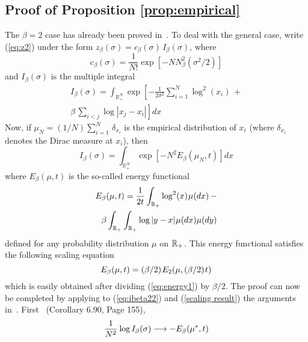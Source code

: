 \documentclass[draftclsnofoot]{IEEEtran}
\begin{document}
\subsection{Proof of Proposition \ref{prop:empirical}}
The $\beta = 2$ case has already been proved in~\cite{habilitation}. To deal with the general case, write (\ref{eq:z2}) under the form $z_{\beta}(\sigma)=c_{\beta}(\sigma)\,I_{\beta}(\sigma)$, where
$$
c_{\beta}(\sigma)=\frac{1}{N!}\exp\left[-NN^2_\beta(\sigma^2/2)\right]
$$
and $I_\beta(\sigma)$ is the multiple integral
\begin{align}
\nonumber I_\beta(\sigma) = \int_{\mathbb{R}^N_+}\exp\left[-\frac{1}{2\sigma^2}\sum^N_{i=1} \log^2(x_i)\right. \,+ \\
\nonumber \left. \beta\,\sum_{i<j} \log|x_j - x_i|\right]dx 
\end{align}
Now, if $\mu_{\scriptscriptstyle N} = (1/N)\sum^N_{i=1}\,\delta_{x_i}$ is the empirical distribution of $x_i$ (where $\delta_{x_i}$ denotes the Dirac measure at $x_i$), then 
\begin{equation} \label{eq:ibeta22}
I_\beta(\sigma) = \int_{\mathbb{R}^N_+}\exp\left[-N^2E_{\beta}(\mu_{\scriptscriptstyle N},t)\right]dx 
\end{equation}
where $E_{\beta}(\mu,t)$ is the so-called energy functional
\begin{align} \label{eq:energy1}
\nonumber E_{\beta}(\mu,t) = \frac{1}{2t}\int_{\mathbb{R}_+}\log^2(x)\hspace{0.02cm}\mu(dx) \,- \\\beta \int_{\mathbb{R}_+}\int_{\mathbb{R}_+} \log|y-x|\hspace{0.02cm}\mu(dx)\mu(dy)
\end{align}
defined for any probability distribution $\mu$ on $\mathbb{R}_+\hspace{0.02cm}$.
This energy functional satisfies the following scaling equation
\begin{equation} \label{scaling result}
    E_{\beta}(\mu,t)=(\beta/2)\hspace{0.03cm}E_{2}\!\left(\mu,(\beta/2)\hspace{0.03cm} t\right)
\end{equation}
which is easily obtained after dividing (\ref{eq:energy1}) by $\beta/2$. The proof can now be completed by applying to (\ref{eq:ibeta22}) and (\ref{scaling result}) the arguments in~\cite{deift}. First~\cite{deift} (Corollary 6.90, Page 155), 
$$
\frac{1}{N^2}\hspace{0.02cm}\log I_\beta(\sigma) \longrightarrow - E_{\beta}(\mu^*,t)
$$
\end{document}
